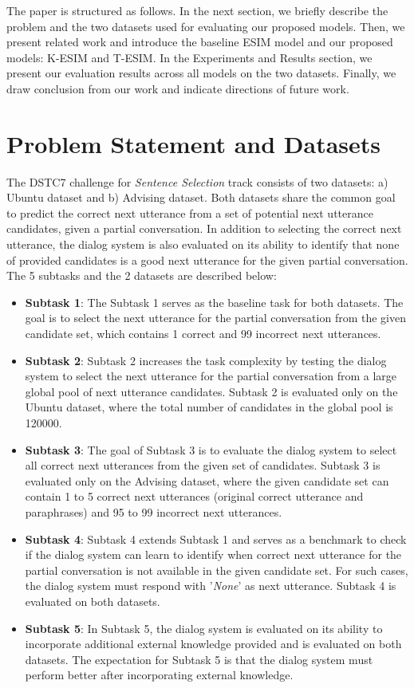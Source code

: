 \documentclass[letterpaper]{article} %
\begin{document}
The paper is structured as follows. In the next section, we briefly describe the problem and the two datasets used for evaluating our proposed models. Then, we present related work and introduce the baseline ESIM model and our proposed models: K-ESIM and T-ESIM. In the Experiments and Results section, we present our evaluation results across all models on the two datasets. Finally, we draw conclusion from our work and indicate directions of future work.

\section{Problem Statement and Datasets}
\label{Problem-Statement-and-datasets}
The DSTC7 challenge for \textit{Sentence Selection} track consists of two datasets: a) Ubuntu dataset and b) Advising dataset. Both datasets share the common goal to predict the correct next utterance from a set of potential next utterance candidates, given a partial conversation. In addition to selecting the correct next utterance, the dialog system is also evaluated on its ability to identify that none of provided candidates is a good next utterance for the given partial conversation. The 5 subtasks and the 2 datasets are described below:
\begin{itemize}
\item \textbf{Subtask 1}: The Subtask 1 serves as the baseline task for both datasets. The goal is to select the next utterance for the partial conversation from the given candidate set, which contains 1 correct and 99 incorrect next utterances.

\item \textbf{Subtask 2}: Subtask 2 increases the task complexity by testing the dialog system to select the next utterance for the partial conversation from a large global pool of next utterance candidates. Subtask 2 is evaluated only on the Ubuntu dataset, where the total number of candidates in the global pool is 120000.

\item \textbf{Subtask 3}: The goal of Subtask 3 is to evaluate the dialog system to select all correct next utterances from the given set of candidates. Subtask 3 is evaluated only on the Advising dataset, where the given candidate set can contain 1 to 5 correct next utterances (original correct utterance and paraphrases) and 95 to 99 incorrect next utterances.

\item \textbf{Subtask 4}: Subtask 4 extends Subtask 1 and serves as a benchmark to check if the dialog system can learn to identify when correct next utterance for the partial conversation is not available in the given candidate set. For such cases, the dialog system must respond with '\textit{None}' as next utterance. Subtask 4 is evaluated on both datasets.

\item \textbf{Subtask 5}: In Subtask 5, the dialog system is evaluated on its ability to incorporate additional external knowledge provided and is evaluated on both datasets. The expectation for Subtask 5 is that the dialog system must perform better after incorporating external knowledge.
\end{itemize}
\end{document}

